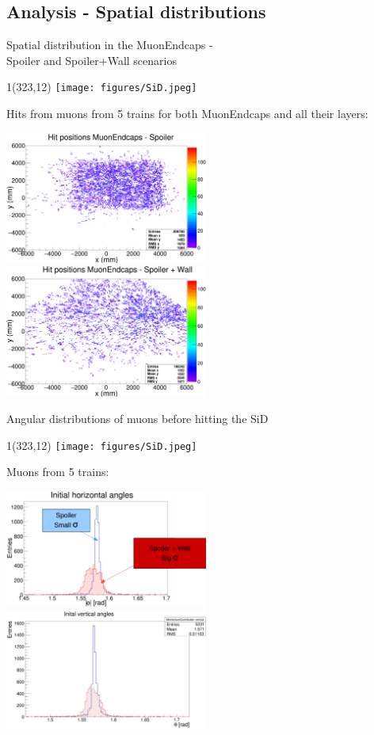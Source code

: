 \documentclass[xcolor={dvipsnames}]{beamer}
\newcommand{\sidlogo}{
  \setlength{\TPHorizModule}{1pt}
  \setlength{\TPVertModule}{1pt}
  \begin{textblock}{1}(323,12)
   \texttt{[image: figures/SiD.jpeg]}
  \end{textblock}
  }
\begin{document}
\subsection{Analysis - Spatial distributions}
\begin{frame}{Spatial distribution in the MuonEndcaps - \\ \small Spoiler and Spoiler+Wall scenarios}
\sidlogo
Hits from muons from 5 trains for both MuonEndcaps and all their layers:
 \begin{center}
\includegraphics[width=0.5\textwidth]{Spatial_distribution_MuonEndcap_Spoiler.pdf}
\hspace*{0.1cm}
\includegraphics[width=0.5\textwidth]{Spatial_distribution_MuonEndcap_SpoilerWall.pdf}
\end{center}
\end{frame}
\begin{frame}{Angular distributions of muons \small before hitting the SiD}
\sidlogo
Muons from 5 trains:
 \begin{center}
\includegraphics[width=0.5\textwidth]{horizontalAngular_distributions.pdf}
\hspace*{0.1cm}
\includegraphics[width=0.5\textwidth]{verticalAngular_distributions.pdf}
\end{center}
\end{frame}
\end{document}
